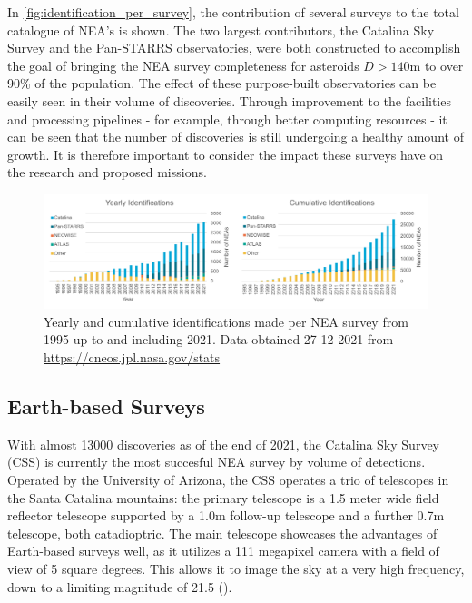 In \autoref{fig:identification_per_survey}, the contribution of several surveys to the total catalogue of NEA's is shown. The two largest contributors, the Catalina Sky Survey and the Pan-STARRS observatories, were both constructed to accomplish the goal of bringing the NEA survey completeness for asteroids $D > 140 \mathrm{m}$ to over 90\% of the population. The effect of these purpose-built observatories can be easily seen in their volume of discoveries. Through improvement to the facilities and processing pipelines - for example, through better computing resources - it can be seen that the number of discoveries is still undergoing a healthy amount of growth. It is therefore important to consider the impact these surveys have on the research and proposed missions.

\begin{figure}[htbp]
 \centering
 \includegraphics[width=1.0\textwidth]{img/identification_per_survey.pdf}
 \caption{Yearly and cumulative identifications made per NEA survey from 1995 up to and including 2021. Data obtained 27-12-2021 from \url{https://cneos.jpl.nasa.gov/stats}}
 \label{fig:identification_per_survey}
\end{figure}


\subsection{Earth-based Surveys}
With almost 13000 discoveries as of the end of 2021, the Catalina Sky Survey (CSS) is currently the most succesful NEA survey by volume of detections. Operated by the University of Arizona, the CSS operates a trio of telescopes in the Santa Catalina mountains: the primary telescope is a 1.5 meter wide field reflector telescope supported by a 1.0m follow-up telescope and a further 0.7m telescope, both catadioptric. The main telescope showcases the advantages of Earth-based surveys well, as it utilizes a 111 megapixel camera with a field of view of 5 square degrees. This allows it to image the sky at a very high frequency, down to a limiting magnitude of 21.5 (\cite{CatalinaSkySurvey}).\\

